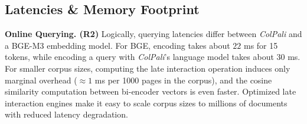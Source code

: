

\subsection{Latencies \& Memory Footprint}
\label{subsection:latency}


\noindent \textbf{Online Querying. (R2)} Logically, querying latencies differ between \textit{ColPali} and a BGE-M3 embedding model. For BGE, encoding takes about $22$ ms for 15 tokens, while encoding a query with \textit{ColPali}'s language model takes about $30$ ms. For smaller corpus sizes, computing the late interaction operation induces only marginal overhead ($\approx 1$ ms per 1000 pages in the corpus), and the cosine similarity computation between bi-encoder vectors is even faster. Optimized late interaction engines  make it easy to scale corpus sizes to millions of documents with reduced latency degradation.


